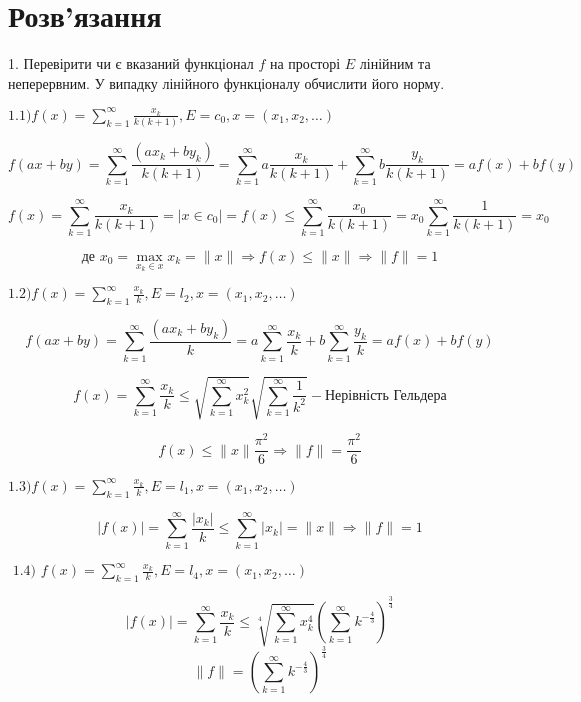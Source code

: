 \section*{Розв'язання}
\begin{tcolorbox}[title=Завдлання 1]
    1. Перевірити чи є вказаний функціонал $f$ на просторі $E$ лінійним та неперервним. У випадку лінійного функціоналу обчислити його норму.

    $
    1.1) f(x)=\sum_{k=1}^{\infty} \frac{x_{k}}{k(k+1)}, E=c_{0}, x=(x_{1}, x_{2}, \ldots) 
    $

    $$ f(ax+by) = \sum_{k=1}^{\infty} \frac{(ax_{k} + by_{k})}{k(k+1)} = 
    \sum_{k=1}^{\infty} a\frac{x_{k}}{k(k+1)} + 
    \sum_{k=1}^{\infty} b\frac{y_{k}}{k(k+1)} = af(x) + bf(y)$$

    $$ f(x) = \sum_{k=1}^{\infty}\frac{x_{k}}{k(k+1)}= |x\in c_0|= f(x) \le 
    \sum_{k=1}^{\infty}\frac{x_{0}}{k(k+1)} = x_0\sum_{k=1}^{\infty}\frac{1}{k(k+1)} 
    = x_0$$ 

    $$\text{де } x_0 = \max_{x_k \in x} x_k = \|x\| 
    \Rightarrow f(x) \le \|x\| \Rightarrow \|f\| = 1$$

    $
    1.2) f(x)=\sum_{k=1}^{\infty} \frac{x_{k}}{k}, E=l_{2}, x=(x_{1}, x_{2}, \ldots) 
    $

    $$ f(ax+by) = \sum_{k=1}^{\infty} \frac{(ax_{k} + by_{k})}{k} = 
    a \sum_{k=1}^{\infty} \frac{x_{k}}{k} + b \sum_{k=1}^{\infty} \frac{y_{k}}{k} = 
    af(x) + bf(y)$$
    
    $$f(x)= \sum_{k=1}^{\infty} \frac{x_{k}}{k} \le 
    \sqrt{\sum_{k=1}^{\infty}x_{k}^2} \sqrt{\sum_{k=1}^{\infty}\frac{1}{k^2}} - 
    \text{Нерівність Гельдера} $$

    $$f(x)\le \|x\| \frac{\pi^2}{6} \Rightarrow \|f\| = \frac{\pi^2}{6} $$

    $
    1.3) f(x)=\sum_{k=1}^{\infty} \frac{x_{k}}{k}, E=l_{1}, x=(x_{1}, x_{2}, \ldots) 
    $

    $$
    |f(x)|= \sum_{k=1}^{\infty} \frac{|x_{k}|}{k} \le \sum_{k=1}^{\infty} |x_{k}| = \|x\| 
    \Rightarrow \|f\| = 1 
    $$

    $
    \text { 1.4) } f(x)=\sum_{k=1}^{\infty} \frac{x_{k}}{k}, E=l_{4}, x=(x_{1}, x_{2}, \ldots) 
    $

    $$ |f(x)| = \sum_{k=1}^{\infty}\frac{x_k}{k} \le 
    \sqrt[4]{\sum_{k=1}^{\infty}x_k^4}
    (\sum_{k=1}^{\infty}k^{-\frac{4}{3}})^{\frac{3}{4}} $$
    $$\|f\|=(\sum_{k=1}^{\infty}k^{-\frac{4}{3}})^{\frac{3}{4}} $$

\end{tcolorbox}

